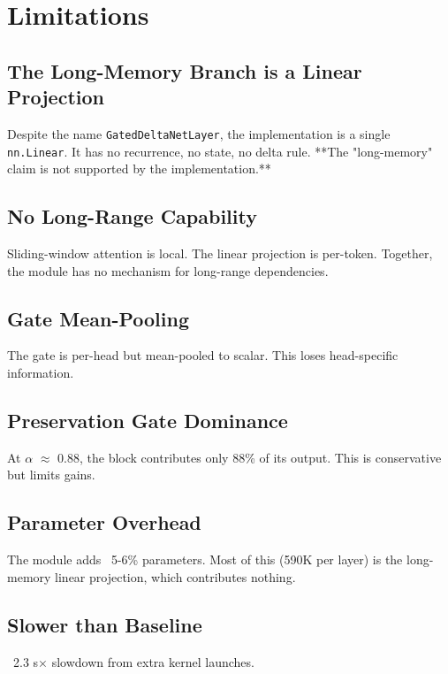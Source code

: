 
\section{Limitations}

\subsection{The Long-Memory Branch is a Linear Projection}

Despite the name \texttt{GatedDeltaNetLayer}, the implementation is a single 
\texttt{nn.Linear}. It has no recurrence, no state, no delta rule. **The 
"long-memory" claim is not supported by the implementation.**

\subsection{No Long-Range Capability}

Sliding-window attention is local. The linear projection is per-token. 
Together, the module has no mechanism for long-range dependencies.

\subsection{Gate Mean-Pooling}

The gate is per-head but mean-pooled to scalar. This loses head-specific 
information.

\subsection{Preservation Gate Dominance}

At $\alpha$ $\approx$ 0.88, the block contributes only 88\% of its output. This is 
conservative but limits gains.

\subsection{Parameter Overhead}

The module adds ~5-6\% parameters. Most of this (590K per layer) is the 
long-memory linear projection, which contributes nothing.

\subsection{Slower than Baseline}

~2.3 s$\times$ slowdown from extra kernel launches.


